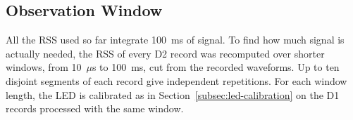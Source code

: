 % 

\subsection{Observation Window}
\label{subsec:res-window}
All the RSS used so far integrate 100~ms of signal. To find how much signal is actually needed, the RSS of every D2 record was recomputed over shorter windows, from 10~$\mu$s to 100~ms, cut from the recorded waveforms. Up to ten disjoint segments of each record give independent repetitions. For each window length, the LED is calibrated as in Section~\ref{subsec:led-calibration} on the D1 records processed with the same window.

